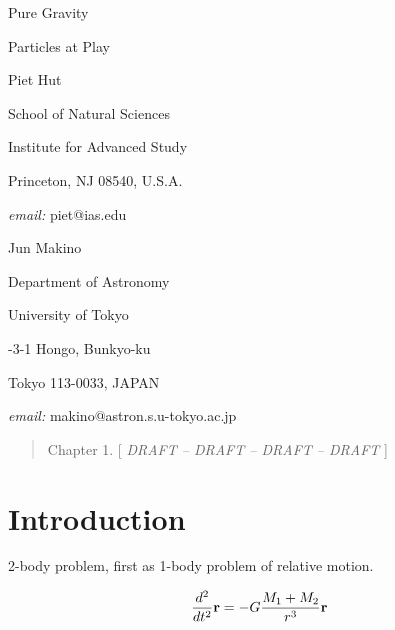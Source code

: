 \begin{center}

{\lgggb Pure Gravity}

\bigskip

{\lggb Particles at Play}

\bigskip

\bigskip

\bigskip

{\slgh Piet Hut}

\bigskip

{\lr School of Natural Sciences}

\medskip

{\lr Institute for Advanced Study}

\medskip

{\lr Princeton, NJ 08540, U.S.A.}

\medskip

{{\it email:} piet@ias.edu}

\bigskip

\bigskip

{\slgh Jun Makino}

\bigskip

{\lr Department of Astronomy}

\medskip

{\lr University of Tokyo}

\medskip

{-3-1 Hongo, Bunkyo-ku}

\medskip

{\lr Tokyo 113-0033, JAPAN}

\medskip

{{\it email:} makino@astron.s.u-tokyo.ac.jp}

\end{center}

\bigskip

\bigskip

\begin{abstract}

Chapter 1. [ {\it DRAFT -- DRAFT -- DRAFT -- DRAFT } ]

\end{abstract}

\newpage
\section{Introduction}

2-body problem, first as 1-body problem of relative motion.

$$
\frac{d^2}{dt^2}{\bf r} = - G \frac{M_1 + M_2}{r^3}{\bf r}
$$

